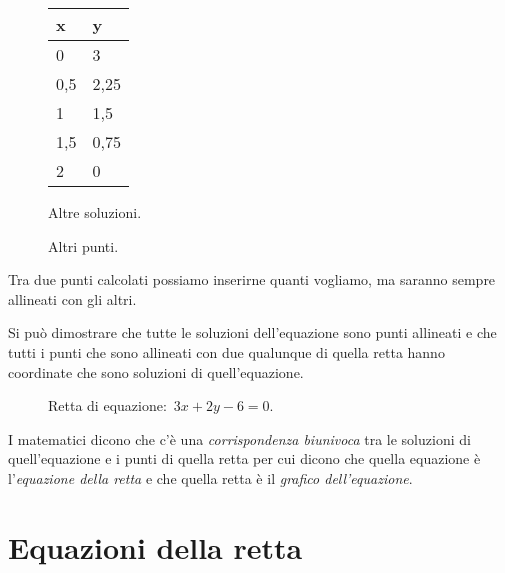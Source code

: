 \begin{inaccessibleblock}
 \begin{figure}[h]
 \centering
 \begin{minipage}[]{.50\textwidth}
  \begin{center}
   \begin{tabular}{l|l}
    x   & y \\
    \hline
    0   & 3    \\
    0,5 & 2,25 \\
    1   & 1,5  \\
    1,5 & 0,75 \\
    2   & 0
   \end{tabular}
  \end{center}
  \caption{Altre soluzioni.}\label{fig:altresoluzioni}
 \end{minipage}
 \begin{minipage}[]{.40\textwidth}
  \centering
  \caption{Altri punti.}\label{fig:ingrandimento}
 \end{minipage}
\end{figure}
\end{inaccessibleblock}

Tra due punti calcolati possiamo inserirne quanti vogliamo, ma saranno sempre 
allineati con gli altri.

Si può dimostrare che tutte le soluzioni dell'equazione sono punti allineati 
e che tutti i punti che sono allineati con due qualunque di quella retta hanno
coordinate che sono soluzioni di quell'equazione. 

\begin{inaccessibleblock}
 \begin{figure}[h]
 \centering
 \caption{Retta di equazione:~$3x + 2y - 6 = 0$.}\label{fig:retta01}
\end{figure}
\end{inaccessibleblock}

I matematici dicono che c'è una \emph{corrispondenza biunivoca} tra le 
soluzioni di quell'equazione e i punti di quella retta per cui dicono che 
quella equazione è l'\emph{equazione della retta} e che quella retta è il 
\emph{grafico dell'equazione}.

\section{Equazioni della retta}
\label{sec:retta_equazioni}

